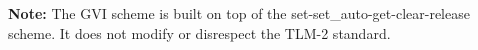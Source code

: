 \documentclass[a4paper,10pt]{article}          %
\begin{document}
\textbf{Note:} The GVI scheme is built on top of the set-set\_auto-get-clear-release scheme. It does not modify or disrespect the TLM-2 standard.












\end{document}
